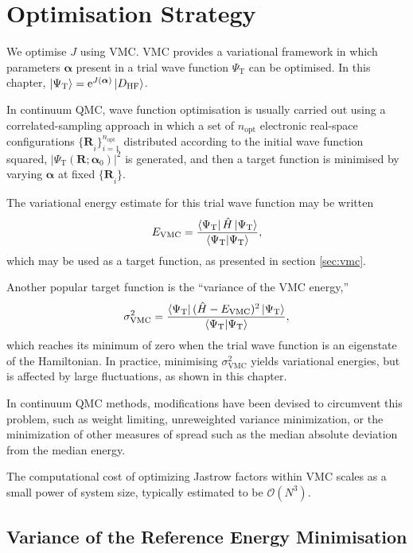 \section{Optimisation Strategy}

We optimise $J$ using \gls{VMC}. VMC provides a variational framework in which parameters $\bm \alpha$ present in a trial wave function $\Psi_\mathrm{T}$ can be optimised. In this chapter, $\ket{\Psi_\mathrm{T}} = \mathrm{e}^{J(\bm\alpha)}\ket{D_\mathrm{HF}}$.

In continuum QMC, wave function optimisation is usually carried out using a correlated-sampling approach in which a set of $n_\mathrm{opt}$ electronic real-space configurations ${\{\bm R}_{i}\}_{i=1}^{n_\mathrm{opt}}$ distributed according to the initial wave function squared, $|\Psi_\mathrm{T}({\bm R}; {\bm \alpha}_0)|^2$ is generated, and then a target function is minimised by varying $\bm\alpha$ at fixed ${\{\bm R}_{i}\}$.

The variational energy estimate for this trial wave function may be written
\begin{equation}
    E_\mathrm{VMC} = \frac{\bra{\Psi_\mathrm{T}} \hat H \ket{\Psi_\mathrm{T}} }{ \braket{\Psi_\mathrm{T}}{\Psi_\mathrm{T}} },
\end{equation}
which may be used as a target function, as presented in section \ref{sec:vmc}.

Another popular target function is the ``variance of the VMC energy,''\supercite{umrigarOptimized1988,kentMonte1999}
\begin{equation}
\sigma_\mathrm{VMC}^2 = \frac{\bra{\Psi_\mathrm{T}}(\hat H - E_\mathrm{VMC})^2\ket{\Psi_\mathrm{T}}}{\braket{\Psi_\mathrm{T}}},
\end{equation}
which reaches its minimum of zero when the trial wave function is an eigenstate of the Hamiltonian. In practice, minimising $\sigma_\mathrm{VMC}^2$ yields variational energies, but is affected by large fluctuations, as shown in this chapter.

In continuum QMC methods, modifications have been devised to
circumvent this problem, such as weight limiting, unreweighted
variance minimization, or the minimization of other measures of spread
such as the median absolute deviation from the median energy.\supercite{needsVariational2020}

The computational cost of optimizing Jastrow factors within VMC scales
as a small power of system size, typically estimated to be ${\mathcal
O}(N^3)$.

\subsection{Variance of the Reference Energy Minimisation}

